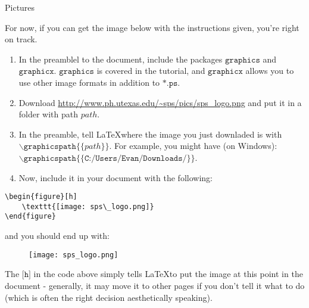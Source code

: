 \documentclass{article}
\begin{document}
\begin{section}{Pictures}

For now, if you can get the image below with the instructions given, you're right on track.
\begin{enumerate}[1.]
	\item{In the preamblel to the document, include the packages $\texttt{graphics}$ and $\texttt{graphicx}$. $\texttt{graphics}$ is covered in the tutorial, and  $\texttt{graphicx}$ allows you to use other image formats in addition to $\texttt{*.ps}$.}
	\item{Download \url{http://www.ph.utexas.edu/~sps/pics/sps_logo.png} and put it in a folder with path $path$.}
	\item{In the preamble, tell \LaTeX where the image you just downladed is with $\backslash{\texttt{graphicspath}\{ \{path\} \}}$. 
	For example, you might have (on Windows):	\\
	$\backslash{\texttt{graphicspath\{ \{C:/Users/Evan/Downloads/\} \}}}$.}
	\item{Now, include it in your document with the following:}
\end{enumerate}
\begin{verbatim}
\begin{figure}[h]
    \texttt{[image: sps\_logo.png]}
\end{figure}
\end{verbatim}
and you should end up with:

\begin{figure}[h]
	\texttt{[image: sps\_logo.png]}
\end{figure}

The $\texttt{[h]}$ in the code above simply tells \LaTeX to put the image at this point in the document - generally, it may move it to other pages if you don't tell it what to do 
(which is often the right decision aesthetically speaking).
\end{section}
\end{document}
